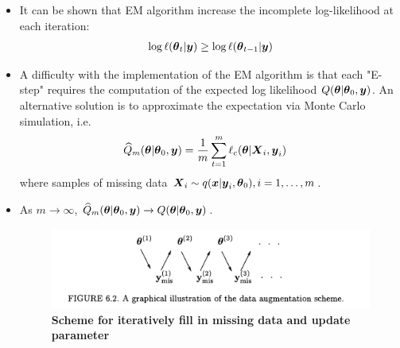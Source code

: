 \documentclass[11pt]{article}
\begin{document}
\begin{itemize}
\item It can be shown that EM algorithm increase the incomplete log-likelihood at each iteration:
\begin{align*}
\log\ell(\boldsymbol{\theta}_{t}|\boldsymbol{y}) \ge \log\ell(\boldsymbol{\theta}_{t-1}|\boldsymbol{y})
\end{align*}

\item A difficulty with the implementation of the EM algorithm is that each "E-step" requires the computation of the expected log likelihood $Q(\boldsymbol{\theta}|\boldsymbol{\theta}_{0}, \boldsymbol{y})$. An alternative solution is to approximate the expectation via Monte Carlo simulation, i.e. 
\begin{align}
\widehat{Q}_{m}(\boldsymbol{\theta}|\boldsymbol{\theta}_{0}, \boldsymbol{y}) &= \frac{1}{m}\sum_{t=1}^{m}\ell_{c}(\boldsymbol{\theta}|\boldsymbol{X}_i, \boldsymbol{y}_i)
\end{align} where samples of missing data $\boldsymbol{X}_i \sim q(\boldsymbol{x}|\boldsymbol{y}_{i},\boldsymbol{\theta}_0), i=1,\ldots, m$.

\item As $m\rightarrow \infty$, $\widehat{Q}_{m}(\boldsymbol{\theta}|\boldsymbol{\theta}_{0}, \boldsymbol{y}) \rightarrow Q(\boldsymbol{\theta}|\boldsymbol{\theta}_{0}, \boldsymbol{y})$.

\begin{figure}
\begin{minipage}[t]{1\linewidth}
  \centering
  \centerline{\includegraphics[scale = 0.5]{data_augmentation.png}}
\end{minipage}
\caption{\footnotesize{\textbf{Scheme for iteratively fill in missing data and update parameter \citep{liu2001monte}}}}
\label{fig: data_augmentation}
\end{figure}
\end{itemize}
\newpage


\end{document}
